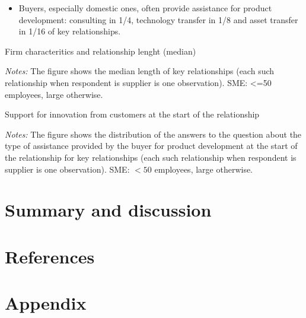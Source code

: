 \documentclass[final, dvipsnames, authoryear,12pt]{elsarticle}
\begin{document}
\begin{itemize}
    \item Buyers, especially domestic ones, often provide assistance for product development: consulting in 1/4, technology transfer in 1/8 and asset transfer in 1/16 of key relationships.
\end{itemize}
    
\begin{table}[h]
    \caption{Firm characteritics and relationship lenght (median)}
    \label{tab:char_length}    
    
    {\scriptsize \textit{Notes:} The figure shows the median length of key relationships (each such relationship when respondent is supplier is one observation). SME: <=50 employees, large otherwise.}
\end{table}


\begin{table}[h]
    \caption{Support for innovation from customers at the start of the relationship}
    \label{tab:start_support}
    
    {\scriptsize \textit{Notes:} The figure shows the distribution of the answers to the question about the type of assistance provided by the buyer for product development at the start of the relationship for key relationships (each such relationship when respondent is supplier is one observation). SME: $<50$ employees, large otherwise.}
\end{table}



\section{Summary and discussion}




\section{References}




\appendix
\section{Appendix}
\end{document}
